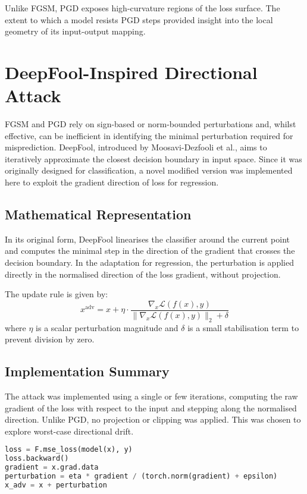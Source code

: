 Unlike FGSM, PGD exposes high-curvature regions of the loss surface. The extent to which a model resists PGD steps provided insight into the local geometry of its input-output mapping.

\section{DeepFool-Inspired Directional Attack}

FGSM and PGD rely on sign-based or norm-bounded perturbations and, whilst effective, can be inefficient in identifying the minimal perturbation required for misprediction. DeepFool, introduced by Moosavi-Dezfooli et al., aims to iteratively approximate the closest decision boundary in input space. Since it was originally designed for classification, a novel modified version was implemented here to exploit the gradient direction of loss for regression.

\subsection*{Mathematical Representation}
In its original form, DeepFool linearises the classifier around the current point and computes the minimal step in the direction of the gradient that crosses the decision boundary. In the adaptation for regression, the perturbation is applied directly in the normalised direction of the loss gradient, without projection.

The update rule is given by:
\[
x^{\text{adv}} = x + \eta \cdot \frac{\nabla_x \mathcal{L}(f(x), y)}{ \| \nabla_x \mathcal{L}(f(x), y) \|_2 + \delta }
\]
where $\eta$ is a scalar perturbation magnitude and $\delta$ is a small stabilisation term to prevent division by zero.

\subsection*{Implementation Summary}
The attack was implemented using a single or few iterations, computing the raw gradient of the loss with respect to the input and stepping along the normalised direction. Unlike PGD, no projection or clipping was applied. This was chosen to explore worst-case directional drift.

\begin{lstlisting}[language=Python, caption={Directional (DeepFool-like) Gradient Attack}]
loss = F.mse_loss(model(x), y)
loss.backward()
gradient = x.grad.data
perturbation = eta * gradient / (torch.norm(gradient) + epsilon)
x_adv = x + perturbation
\end{lstlisting}

